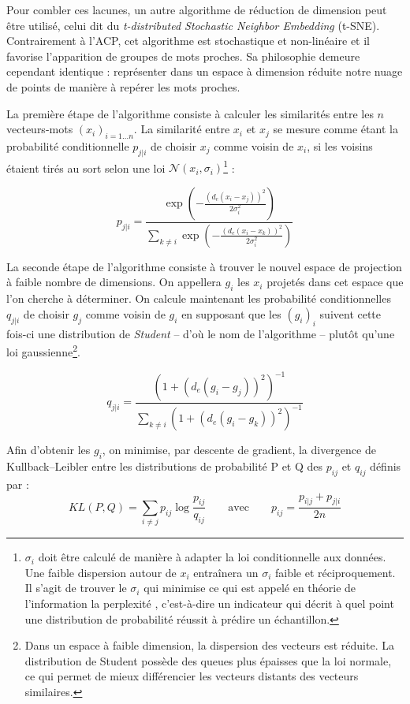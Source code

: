 \documentclass[11pt,french,french]{article}
\let\rmarkdownfootnote\footnote%
\def\footnote{\protect\rmarkdownfootnote}
\begin{document}
Pour combler ces lacunes, un autre algorithme de réduction de dimension
peut être utilisé, celui dit du \emph{t-distributed Stochastic Neighbor
Embedding} (t-SNE). Contrairement à l'ACP, cet algorithme est
stochastique et non-linéaire et il favorise l'apparition de groupes de
mots proches. Sa philosophie demeure cependant identique : représenter
dans un espace à dimension réduite notre nuage de points de manière à
repérer les mots proches.

La première étape de l'algorithme consiste à calculer les similarités
entre les \(n\) vecteurs-mots \((x_i)_{i=1...n}\). La similarité entre
\(x_i\) et \(x_j\) se mesure comme étant la probabilité conditionnelle
\(p_{j|i}\) de choisir \(x_j\) comme voisin de \(x_i\), si les voisins
étaient tirés au sort selon une loi
\(\mathcal{N}(x_i, \sigma_i)\)\footnote{\(\sigma_i\) doit être calculé
  de manière à adapter la loi conditionnelle aux données. Une faible
  dispersion autour de \(x_i\) entraînera un \(\sigma_i\) faible et
  réciproquement. Il s'agit de trouver le \(\sigma_i\) qui minimise ce
  qui est appelé en théorie de l'information la \og perplexité \fg{},
  c'est-à-dire un indicateur qui décrit à quel point une distribution de
  probabilité réussit à prédire un échantillon.} :

\[ p_{j|i} = \frac{
\exp\left(-\frac{(d_e(x_i - x_j))^2}{2\sigma_i^2}\right)
}{
\sum_{k \neq i}
\exp\left(-\frac{(d_e(x_i - x_k))^2}{2\sigma_i^2}\right)
}\]

La seconde étape de l'algorithme consiste à trouver le nouvel espace de
projection à faible nombre de dimensions. On appellera \(g_i\) les
\(x_i\) projetés dans cet espace que l'on cherche à déterminer. On
calcule maintenant les probabilité conditionnelles \(q_{j|i}\) de
choisir \(g_j\) comme voisin de \(g_i\) en supposant que les \((g_i)_i\)
suivent cette fois-ci une distribution de \emph{Student} -- d'où le nom
de l'algorithme -- plutôt qu'une loi gaussienne\footnote{Dans un espace
  à faible dimension, la dispersion des vecteurs est réduite. La
  distribution de Student possède des queues plus épaisses que la loi
  normale, ce qui permet de mieux différencier les vecteurs distants des
  vecteurs similaires.}.

\[ q_{j|i} = \frac{(1+ (d_e(g_i - g_j))^2)^{-1}}{\sum_{k \neq i}{(1+ (d_e(g_i - g_k))^2)^{-1}}}\]

Afin d'obtenir les \(g_i\), on minimise, par descente de gradient, la
divergence de Kullback--Leibler entre les distributions de probabilité P
et Q des \(p_{ij}\) et \(q_{ij}\) définis par :
\[KL(P,Q) = \sum_{i \neq j} { p_{ij} \log{\frac{p_{ij}}{q_{ij}}}} \qquad\text{avec}\qquad p_{ij} = \frac{p_{i|j} + p_{j|i}}{2n}\]
\end{document}
